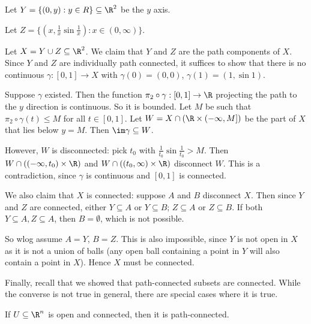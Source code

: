 \documentclass[a4paper]{article}
\begin{document}
\begin{eg}
  Let $Y = \{(0, y): y\in R\}\subseteq \R^2$ be the $y$ axis.

  Let $Z = \{(x, \frac{1}{x}\sin \frac{1}{x}): x\in (0, \infty)\}$.
  \begin{center}
  \end{center}
  Let $X = Y\cup Z\subseteq \R^2$. We claim that $Y$ and $Z$ are the path components of $X$. Since $Y$ and $Z$ are individually path connected, it suffices to show that there is no continuous $\gamma: [0, 1]\to X$ with $\gamma(0) = (0, 0)$, $\gamma(1) = (1,\sin 1)$.

  Suppose $\gamma$ existed. Then the function $\pi_2\circ \gamma: [0, 1] \to \R$ projecting the path to the $y$ direction is continuous. So it is bounded. Let $M$ be such that $\pi_2\circ \gamma (t) \leq M$ for all $t\in [0, 1]$. Let $W = X\cap (\R \times (-\infty, M])$ be the part of $X$ that lies below $y = M$.  Then $\im \gamma \subseteq W$.

  However, $W$ is disconnected: pick $t_0$ with $\frac{1}{t_0} \sin\frac{1}{t_0} > M$. Then $W \cap ((-\infty, t_0)\times \R)$ and $W\cap ((t_0, \infty)\times \R)$ disconnect $W$. This is a contradiction, since $\gamma$ is continuous and $[0, 1]$ is connected.

  We also claim that $X$ is connected: suppose $A$ and $B$ disconnect $X$. Then since $Y$ and $Z$ are connected, either $Y\subseteq A$ or $Y\subseteq B$; $Z\subseteq A$ or $Z\subseteq B$. If both $Y\subseteq A, Z\subseteq A$, then $B=\emptyset$, which is not possible.

  So wlog assume $A = Y$, $B = Z$. This is also impossible, since $Y$ is not open in $X$ as it is not a union of balls (any open ball containing a point in $Y$ will also contain a point in $X$). Hence $X$ must be connected.
\end{eg}

Finally, recall that we showed that path-connected subsets are connected. While the converse is not true in general, there are special cases where it is true.
\begin{prop}
  If $U\subseteq \R^n$ is open and connected, then it is path-connected.
\end{prop}
\end{document}
